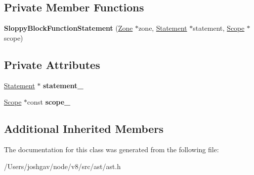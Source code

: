 \subsection*{Private Member Functions}
\begin{DoxyCompactItemize}
\item 
{\bfseries Sloppy\+Block\+Function\+Statement} (\hyperlink{classv8_1_1internal_1_1_zone}{Zone} $\ast$zone, \hyperlink{classv8_1_1internal_1_1_statement}{Statement} $\ast$statement, \hyperlink{classv8_1_1internal_1_1_scope}{Scope} $\ast$scope)\hypertarget{classv8_1_1internal_1_1_sloppy_block_function_statement_a8c2496e2ef171505caf6f5df68d28a66}{}\label{classv8_1_1internal_1_1_sloppy_block_function_statement_a8c2496e2ef171505caf6f5df68d28a66}

\end{DoxyCompactItemize}
\subsection*{Private Attributes}
\begin{DoxyCompactItemize}
\item 
\hyperlink{classv8_1_1internal_1_1_statement}{Statement} $\ast$ {\bfseries statement\+\_\+}\hypertarget{classv8_1_1internal_1_1_sloppy_block_function_statement_a3ef51276675bd7f7c2841f9a7c3c9dc0}{}\label{classv8_1_1internal_1_1_sloppy_block_function_statement_a3ef51276675bd7f7c2841f9a7c3c9dc0}

\item 
\hyperlink{classv8_1_1internal_1_1_scope}{Scope} $\ast$const {\bfseries scope\+\_\+}\hypertarget{classv8_1_1internal_1_1_sloppy_block_function_statement_a36b513e05dcb62f195f2b7c0861e2a0e}{}\label{classv8_1_1internal_1_1_sloppy_block_function_statement_a36b513e05dcb62f195f2b7c0861e2a0e}

\end{DoxyCompactItemize}
\subsection*{Additional Inherited Members}


The documentation for this class was generated from the following file\+:\begin{DoxyCompactItemize}
\item 
/\+Users/joshgav/node/v8/src/ast/ast.\+h\end{DoxyCompactItemize}
